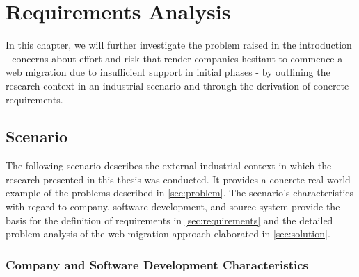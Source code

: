 \hypertarget{sec:requirements-analysis}{%
\chapter{Requirements Analysis}\label{sec:requirements-analysis}}

In this chapter, we will further investigate the problem raised in the introduction - concerns about effort and risk that render companies hesitant to commence a web migration due to insufficient support in initial phases - by outlining the research context in an industrial scenario and through the derivation of concrete requirements.

\hypertarget{sec:scenario}{%
\section{Scenario}\label{sec:scenario}}

The following scenario describes the external industrial context in which the research presented in this thesis was conducted.
It provides a concrete real-world example of the problems described in \cref{sec:problem}.
The scenario's characteristics with regard to company, software development, and source system provide the basis for the definition of requirements in \cref{sec:requirements} and the detailed problem analysis of the web migration approach elaborated in \cref{sec:solution}.

\hypertarget{sec:company-characteristics}{%
\subsection{Company and Software Development Characteristics}\label{sec:company-characteristics}}

